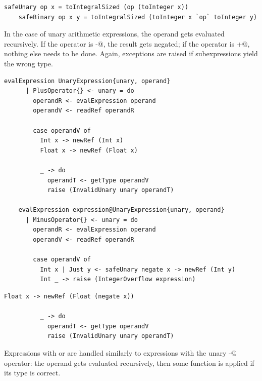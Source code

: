 \documentclass[UdineBachThesis,american,11pt]{PhdThesis}
\begin{document}
  \begin{lstlisting}[gobble=4,basicstyle=\ttfamily\small]
    safeUnary op x = toIntegralSized (op (toInteger x))
    safeBinary op x y = toIntegralSized (toInteger x `op` toInteger y)
  \end{lstlisting}

  In the case of unary arithmetic expressions, the operand gets evaluated
  recursively. If the operator is \lstinline@-@, the result gets negated; if the
  operator is \lstinline@+@, nothing else needs to be done. Again, exceptions
  are raised if subexpressions yield the wrong type.

  \begin{lstlisting}[gobble=4,basicstyle=\ttfamily\small]
    evalExpression UnaryExpression{unary, operand}
      | PlusOperator{} <- unary = do
        operandR <- evalExpression operand
        operandV <- readRef operandR

        case operandV of
          Int x -> newRef (Int x)
          Float x -> newRef (Float x)

          _ -> do
            operandT <- getType operandV
            raise (InvalidUnary unary operandT)

    evalExpression expression@UnaryExpression{unary, operand}
      | MinusOperator{} <- unary = do
        operandR <- evalExpression operand
        operandV <- readRef operandR

        case operandV of
          Int x | Just y <- safeUnary negate x -> newRef (Int y)
          Int _ -> raise (IntegerOverflow expression)
  \end{lstlisting}

  \newpage

  \begin{lstlisting}[gobble=4,basicstyle=\ttfamily\small]
          Float x -> newRef (Float (negate x))

          _ -> do
            operandT <- getType operandV
            raise (InvalidUnary unary operandT)
  \end{lstlisting}

  Expressions with \lstinline@not@ or \lstinline@len@ are handled similarly to
  expressions with the unary \lstinline@-@ operator: the operand gets evaluated
  recursively, then some function is applied if its type is correct.
\end{document}
